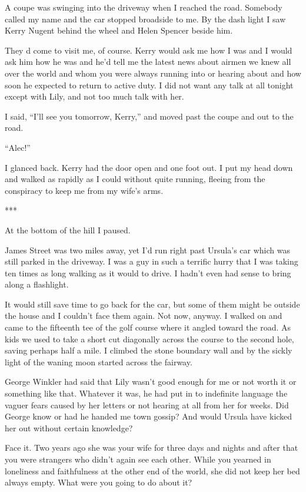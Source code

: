 \documentclass{novel}
\begin{document}
A coupe was swinging into the driveway when I reached the road. Somebody called my name and the car stopped broadside to me. By the dash light I saw Kerry Nugent behind the wheel and Helen Spencer beside him.

They d come to visit me, of course. Kerry would ask me how I was and I would ask him how he was and he’d tell me the latest news about airmen we knew all over the world and whom you were always running into or hearing about and how soon he expected to return to active duty. I did not want any talk at all tonight except with Lily, and not too much talk with her.

I said, “I’ll see you tomorrow, Kerry,” and moved past the coupe and out to the road.

“Alec!”

I glanced back. Kerry had the door open and one foot out. I put my head down and walked as rapidly as I could without quite running, fleeing from the conspiracy to keep me from my wife’s arms.

***

At the bottom of the hill I paused.

James Street was two miles away, yet I’d run right past Ursula’s car which was still parked in the driveway. I was a guy in such a terrific hurry that I was taking ten times as long walking as it would to drive. I hadn’t even had sense to bring along a flashlight.

It would still save time to go back for the car, but some of them might be outside the house and I couldn’t face them again. Not now, anyway. I walked on and came to the fifteenth tee of the golf course where it angled toward the road. As kids we used to take a short cut diagonally across the course to the second hole, saving perhaps half a mile. I climbed the stone boundary wall and by the sickly light of the waning moon started across the fairway.

George Winkler had said that Lily wasn’t good enough for me or not worth it or something like that. Whatever it was, he had put in to indefinite language the vaguer fears caused by her letters or not hearing at all from her for weeks. Did George know or had he handed me town gossip? And would Ursula have kicked her out without certain knowledge?

Face it. Two years ago she was your wife for three days and nights and after that you were strangers who didn’t again see each other. While you yearned in loneliness and faithfulness at the other end of the world, she did not keep her bed always empty. What were you going to do about it?
\end{document}
